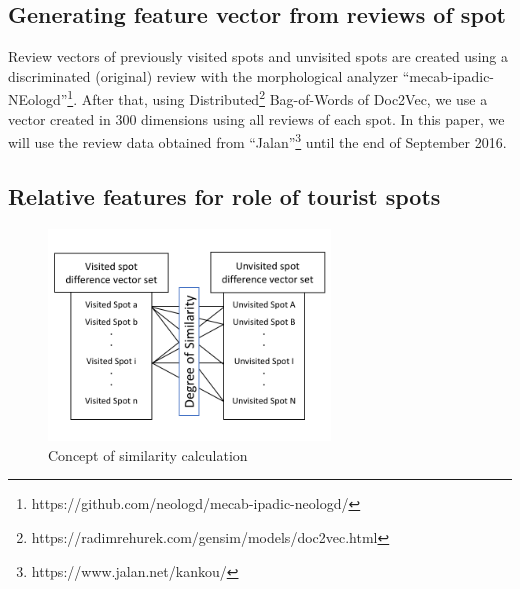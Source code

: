 \documentclass[journal]{IAENGtran}
\begin{document}
\subsection{Generating feature vector from reviews of spot}
\label{subsec:Generating feature vector from reviews of spot}
Review vectors of previously visited spots and unvisited spots are created using a discriminated (original) review with the morphological analyzer\cite{Codd10} ``mecab-ipadic-NEologd''\footnote{https://github.com/neologd/mecab-ipadic-neologd/}.
After that, using Distributed\footnote{https://radimrehurek.com/gensim/models/doc2vec.html} Bag-of-Words of Doc2Vec, we use a vector created in 300 dimensions using all reviews of each spot.
In this paper, we will use the review data obtained from ``Jalan''\footnote{https://www.jalan.net/kankou/} until the end of September 2016.

\subsection{Relative features for role of tourist spots}
\label{subsec:Relative features of tourist spots}

\begin{figure}[t]
  \begin{center}
    \includegraphics[clip,width=7.5cm,bb=0 0 720 540]{picture/Photo_CosSim_eng.png}
    \caption{Concept of similarity calculation}
    \label{fig:Photo_CosSim}
    \end{center}
\end{figure}
\end{document}
